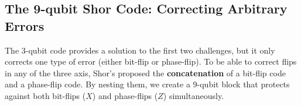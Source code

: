 


\subsection*{The 9-qubit Shor Code: Correcting Arbitrary Errors}
The 3-qubit code provides a solution to the first two challenges, but it only corrects one type of error (either bit-flip or phase-flip). To be able to correct flips in any of the three axis, Shor's proposed the \textbf{concatenation} of a bit-flip code and a phase-flip code. By nesting them, we create a 9-qubit block that protects against both bit-flips ($X$) and phase-flips ($Z$) simultaneously. 

